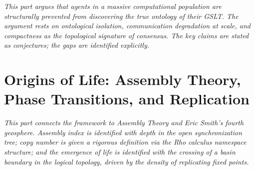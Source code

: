 \documentclass[12pt,openright,twoside]{book}
\theoremstyle{remark}
\theoremstyle{plain}
\theoremstyle{remark}
\theoremstyle{plain}
\theoremstyle{plain}
\begin{document}
\vspace{1em}
\begin{mdframed}[backgroundcolor=remarkgray, linecolor=gray!60,
                 linewidth=1pt, topline=false, rightline=false,
                 bottomline=false]
\small\itshape
This part argues that agents in a massive computational population
are structurally prevented from discovering the true ontology of
their GSLT.
The argument rests on ontological isolation, communication
degradation at scale, and compactness as the topological signature
of consensus.
The key claims are stated as conjectures; the gaps are identified
explicitly.
\end{mdframed}

\bigskip


\part{Origins of Life: Assembly Theory, Phase Transitions, and Replication}

\vspace{1em}
\begin{mdframed}[backgroundcolor=remarkgray, linecolor=gray!60,
                 linewidth=1pt, topline=false, rightline=false,
                 bottomline=false]
\small\itshape
This part connects the framework to Assembly Theory and Eric
Smith's fourth geosphere.
Assembly index is identified with depth in the open synchronization
tree; copy number is given a rigorous definition via the Rho calculus
namespace structure; and the emergence of life is identified with
the crossing of a basin boundary in the logical topology, driven
by the density of replicating fixed points.
\end{mdframed}
\end{document}
